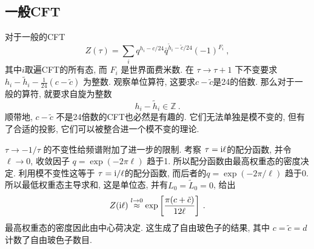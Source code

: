 \subsection*{一般CFT}
对于一般的CFT
\begin{equation}
Z(\tau)=\sum_{i} q^{h_{i}-c / 24} \bar{q}^{\tilde{h}_{i}-\tilde{c} / 24}(-1)^{F_{i}} \:, \label{7.2.28}
\end{equation}
其中$i$取遍CFT的所有态, 而 $F_{i}$ 是世界面费米数. 在 $\tau \rightarrow \tau+1$ 下不变要求 $h_{i}-\tilde{h}_{i}-\frac{1}{24}(c-\tilde{c})$ 为整数. 观察单位算符, 这要求$c-\tilde{c}$是24的倍数. 那么对于一般的算符, 就要求自旋为整数
\begin{equation}
h_{i}-\tilde{h}_{i} \in \mathds{Z} \:. \label{7.2.29}
\end{equation}
顺带地,  $c-\tilde{c}$ 不是24倍数的CFT也必然是有趣的. 它们无法单独是模不变的, 但有了合适的投影, 它们可以被整合进一个模不变的理论.

$\tau \rightarrow-1 / \tau$ 的不变性给频谱附加了进一步的限制. 考察 $\tau=\mathrm{i} \ell$的配分函数, 并令 $\ell \rightarrow 0 $, 
收敛因子 $q=\exp (-2 \pi \ell)$ 趋于1. 所以配分函数由最高权重态的密度决定. 利用模不变性这等于 $\tau=\mathrm{i} / \ell $的配分函数, 
而后者的$q=\exp (-2 \pi / \ell)$ 趋于0. 所以最低权重态主导求和, 这是单位态, 并有$L_{0}=\tilde{L}_{0}=0$, 给出
\begin{equation}
Z(\mathrm{i} \ell) \stackrel{l \rightarrow 0}{\approx} \exp \left[\frac{\pi(c+\tilde{c})}{12 \ell}\right] \:. \label{7.2.30}
\end{equation}
最高权重态的密度因此由中心荷决定. 这生成了自由玻色子的结果, 其中 $c=\tilde{c}=d$计数了自由玻色子数目.

